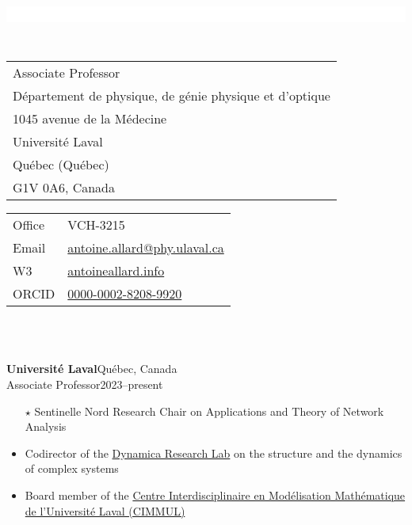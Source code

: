 \documentclass[11pt]{article}
\newcommand{\TitreSection}[1]{\colorbox{background}{\makebox[\textwidth-0.5em][c]{\Large\textrm{\textsc{#1}}}}\vspace{0.75\baselineskip}\\}
\begin{document}
%
\thispagestyle{empty}
%
\color{font}
%
%
%
%
%
\noindent\colorbox{background}{\parbox{\textwidth-0.5em}{\\}}\vspace{0.75\baselineskip}\\
%
\begin{tabular}{l}
Associate Professor\\
D\'epartement de physique, de g\'enie physique et d'optique\\
1045 avenue de la M\'edecine\\
Universit\'e Laval\\
Qu\'ebec (Qu\'ebec)\\G1V 0A6, Canada
\end{tabular}
%
\hfill
%
\begin{tabular}{l @{\ :\ } l}
Office  & VCH-3215\\
Email   & \href{mailto:antoine.allard@phy.ulaval.ca}{antoine.allard@phy.ulaval.ca}\\
W3      & \href{http://antoineallard.info}{antoineallard.info} \\
ORCID   & \href{https://orcid.org/0000-0002-8208-9920}{0000-0002-8208-9920}
\end{tabular} \vspace{1.75\baselineskip} \\
%
%
%
%
%
\TitreSection{Academic Positions}
%
\parbox[t]{\textwidth}{%
\textbf{Universit\'e Laval}\hfill Qu\'ebec, Canada\\
Associate Professor\hfill 2023--present
\begin{itemize}[leftmargin=1.5em]\small
  \item[$\star$] Sentinelle Nord Research Chair on Applications and Theory of Network Analysis
  \item Codirector of the \href{http://dynamica.phy.ulaval.ca}{Dynamica Research Lab} on the structure and the dynamics of complex systems
  \item Board member of the \href{http://cimmul.fsg.ulaval.ca}{Centre Interdisciplinaire en Modélisation Mathématique de l’Université Laval (CIMMUL)}
\end{itemize}}
\end{document}
